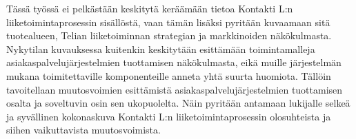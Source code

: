 \documentclass[finnish,12pt,a4paper,pdftex]{article}
\begin{document}
Tässä työssä ei pelkästään keskitytä keräämään tietoa Kontakti L:n liiketoimintaprosessin sisällöstä, vaan tämän lisäksi pyritään kuvaamaan sitä tuotealueen, Telian liiketoiminnan strategian ja markkinoiden näkökulmasta. Nykytilan kuvauksessa kuitenkin keskitytään esittämään toimintamalleja asiakaspalvelujärjestelmien tuottamisen näkökulmasta, eikä muille järjestelmän mukana toimitettaville komponenteille anneta yhtä suurta huomiota. Tällöin tavoitellaan muutosvoimien esittämistä asiakaspalvelujärjestelmien tuottamisen osalta ja soveltuvin osin sen ukopuolelta.
Näin pyritään antamaan lukijalle selkeä ja syvällinen kokonaskuva Kontakti L:n liiketoimintaprosessin olosuhteista ja siihen vaikuttavista muutosvoimista.\\







\end{document}
